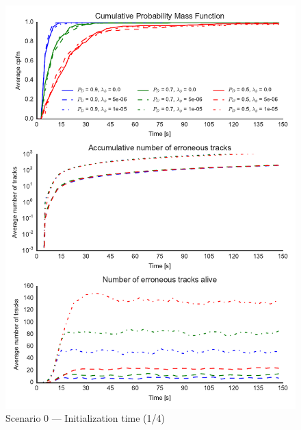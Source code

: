 \begin{figure}
\centering
\includegraphics{Figures/plots/Scenario0_Init-Time(1-4).pdf}
\caption{Scenario 0 --- Initialization time (1/4)}\label{fig:init0_time_1-4}
\end{figure}

